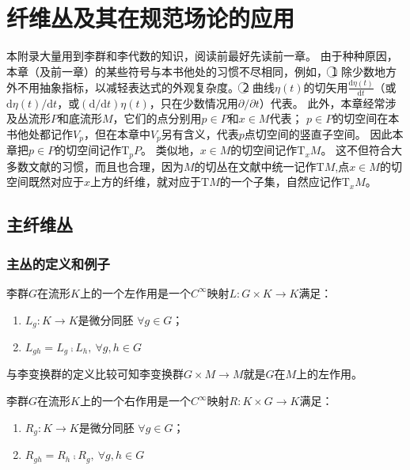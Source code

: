 \chapter[纤维丛及其在规范场论的应用]{\\纤维丛及其在规范场论的应用}

本附录大量用到李群和李代数的知识，阅读前最好先读前一章。
由于种种原因，本章（及前一章）的某些符号与本书他处的习惯不尽相同，例如，
\textcircled{1} 除少数地方外不用抽象指标，以减轻表达式的外观复杂度。
\textcircled{2} 曲线$\eta(t)$的切矢用$\displaystyle\frac{\mathrm{d}\eta(t)}{\mathrm{d}t}$（或$\mathrm{d}\eta(t) / \mathrm{d}t$，或$(\mathrm{d} / \mathrm{d}t)\eta(t)$，只在少数情况用$\partial / \partial t$）代表。
此外，本章经常涉及丛流形$P$和底流形$M$，它们的点分别用$p \in P$和$x \in M$代表；
$p \in P$的切空间在本书他处都记作$V_p$，但在本章中$V_p$另有含义，代表$p$点切空间的竖直子空间。
因此本章把$p \in P$的切空间记作$\mathrm{T}_pP$。
类似地，$x \in M$的切空间记作$\mathrm{T}_xM$。
这不但符合大多数文献的习惯，而且也合理，因为$M$的切丛在文献中统一记作$\mathrm{T}M$,点$x \in M$的切空间既然对应于$x$上方的纤维，就对应于$\mathrm{T}M$的一个子集，自然应记作$\mathrm{T}_xM$。

\section{主纤维丛}

\subsection{主丛的定义和例子}

\begin{definition}
    李群$G$在流形$K$上的一个左作用是一个$C^\infty$映射$L \colon G \times K \to K$满足：
    \begin{enumerate}[（a）]
        \item $L_g \colon K \to K$是微分同胚 $\forall g \in G$；
        \item $L_{gh} = L_g \comp L_h, ~ \forall g, h \in G$
    \end{enumerate}
\end{definition}

\begin{note}
    与李变换群的定义比较可知李变换群$G \times M \to M$就是$G$在$M$上的左作用。
\end{note}

\begin{definition}
    李群$G$在流形$K$上的一个右作用是一个$C^\infty$映射$R \colon K \times G \to K$满足：
    \begin{enumerate}[（a）]
        \item $R_g \colon K \to K$是微分同胚 $\forall g \in G$；
        \item $R_{gh} = R_h \comp R_g, ~ \forall g, h \in G$
    \end{enumerate}  
\end{definition}

